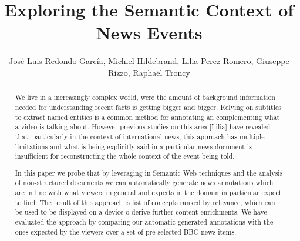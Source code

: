 \documentclass{llncs}
\begin{document}
\frontmatter          %
\pagestyle{headings}  %
\mainmatter              %

\title{Exploring the Semantic Context of News Events}
\author{Jos\'e Luis Redondo Garc\'ia, Michiel Hildebrand, Lilia Perez Romero, Giuseppe Rizzo, Rapha\"el Troncy}


\maketitle              %


\begin{abstract}

We live in a increasingly complex world, were the amount of background information needed for understanding recent facts is getting bigger and bigger. Relying on subtitles to extract named entities is a common method for annotating an complementing what a video is talking about. However previous studies on this area [Lilia] have revealed that, particularly in the context of international news, this approach has multiple limitations and what is being explicitly said in a particular news document is insufficient for reconstructing the whole context of the event being told. 

In this paper we probe that by leveraging in Semantic Web techniques and the analysis of non-structured documents we can automatically generate news annotations which are in line with what viewers in general and experts in the domain in particular expect to find. The result of this approach is list of concepts ranked by relevance, which can be used to be displayed on a device o derive further content enrichments. We have evaluated the approach by comparing our automatic generated annotations with the ones expected by the viewers over a set of pre-selected BBC news items.

\end{abstract}

\end{document}
